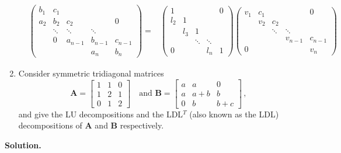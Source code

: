 \documentclass[english,onecolumn]{IEEEtran}
\begin{document}
\begin{enumerate}
$$
\begin{aligned}
	&\left(\begin{array}{ccccc}
		b_{1} & c_{1} & & & \\
		a_{2} & b_{2} & c_{2} & & 0 \\
		& \ddots & \ddots & \ddots & \\
		& 0 & a_{n-1} & b_{n-1} & c_{n-1} \\
		& & & a_{n} & b_{n}
	\end{array}\right)=
	&\left(\begin{array}{ccccc}
		1 & & & &0 \\
		l_{2} & 1 & &  & \\
		& l_{3} & 1 & & \\
		& & \ddots & \ddots & \\
		0&  & &  l_{n} & 1
	\end{array}\right)\left(\begin{array}{ccccc}
		v_{1} & c_{1} & & &0 \\
		& v_{2} & c_{2} & &  \\
		& & \ddots & \ddots & \\
		& & & v_{n-1} & c_{n-1} \\
		0&  & & & v_{n}
	\end{array}\right)
\end{aligned}
$$
\item
Consider symmetric tridiagonal matrices
\[
\mathbf{A} = \begin{bmatrix}
    1 & 1 & 0\\
    1 & 2 & 1 \\
    0 & 1 & 2 
\end{bmatrix}
\quad \text{and  }
\mathbf{B}= \begin{bmatrix}
    a & a & 0 \\
    a & a+b & b \\
    0 & b & b+c
\end{bmatrix}\,,
\]
and give the LU decompositions and the LDL$^T$ (also known as the LDL) decompositions of $\mathbf{A}$ and $\mathbf{B}$ respectively.
\end{enumerate}
\noindent\textbf{Solution.}
\end{document}
